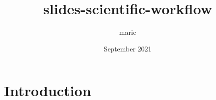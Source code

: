 \documentclass{article}
\title{slides-scientific-workflow}
\author{maric }
\date{September 2021}
\begin{document}
\maketitle

\section{Introduction}
\end{document}
